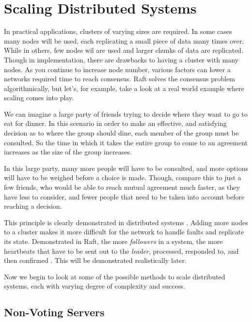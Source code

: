 \section{Scaling Distributed Systems}

In practical applications, clusters of varying sizes are required. In some cases many nodes will be used, each replicating a small piece of data many times over. While in others, few nodes wil are used and larger chunks of data are replicated. Though in implementation, there are drawbacks to having a cluster with many nodes. As you continue to increase node number, various factors can lower a networks required time to reach consensus. Raft solves the consensus problem algorithmically, but let's, for example, take a look at a real world example where scaling comes into play.

We can imagine a large party of friends trying to decide where they want to go to eat for dinner. In this scenario in order to make an effective, and satisfying decision as to where the group should dine, each member of the group must be consulted. So the time in which it takes the entire group to come to an agreement increases as the size of the group increases.

In this large party, many more people will have to be consulted, and more options will have to be weighed before a choice is made. Though, compare this to just a few friends, who would be able to reach mutual agreement much faster, as they have less to consider, and fewer people that need to be taken into account before reaching a decision.

This principle is clearly demonstrated in distributed systems \cite{NeumanScaling}. Adding more nodes to a cluster makes it more difficult for the network to handle faults and replicate its state. Demonstrated in Raft, the more \textit{followers} in a system, the more heartbeats that have to be sent out to the \textit{leader}, processed, responded to, and then confirmed \cite{OngaroRaft}. This will be demonstrated realistically later.


Now we begin to look at some of the possible methods to scale distributed systems, each with varying degree of complexity and success.

\subsection{Non-Voting Servers}

